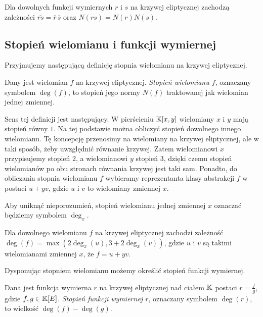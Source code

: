 \begin{fact}
Dla dowolnych funkcji wymiernych $r$ i $s$ na krzywej eliptycznej
zachodzą zależności
$\overline{rs} = \overline{r}\,\overline{s}$
oraz $N(rs) = N(r)N(s)$.
\end{fact}

\subsection*{Stopień wielomianu i funkcji wymiernej}

Przyjmujemy następującą definicję stopnia wielomianu na krzywej eliptycznej.

\begin{definition}
Dany jest wielomian $f$ na krzywej eliptycznej.
\emph{Stopień wielomianu $f$},
oznaczany symbolem $\deg(f)$,
to stopień jego normy $N(f)$ traktowanej jak wielomian jednej zmiennej.
\end{definition}

Sens tej definicji jest następujący.
W pierścieniu $\mathbb{K}[x, y]$ wielomiany $x$ i $y$ mają stopień równy $1$.
Na tej podstawie można obliczyć stopień dowolnego innego wielomianu.
Tę koncepcję przenosimy na wielomiany na krzywej eliptycznej,
ale w taki sposób, żeby uwzględnić równanie krzywej.
Zatem wielomianowi $x$ przypisujemy stopień $2$,
a wielomianowi $y$ stopień $3$,
dzięki czemu stopień wielomianów po obu stronach równania krzywej jest taki sam.
Ponadto, do obliczania stopnia wielomianu $f$
wybieramy reprezentanta klasy abstrakcji $f$ w postaci $u + yv$,
gdzie $u$ i $v$ to wielomiany zmiennej $x$.

\begin{remark}
Aby uniknąć nieporozumień,
stopień wielomianu jednej zmiennej $x$
oznaczać będziemy symbolem $\deg_x$.
\end{remark}

\begin{fact}
Dla dowolnego wielomianu $f$ na krzywej eliptycznej
zachodzi zależność $\deg(f) = \max(2\deg_x(u), 3 + 2\deg_x(v))$,
gdzie $u$ i $v$ są takimi wielomianami zmiennej $x$, że $f = u + yv$.
\end{fact}

Dysponując stopniem wielomianu możemy określić stopień funkcji wymiernej.

\begin{definition}
Dana jest funkcja wymierna $r$ na krzywej eliptycznej nad ciałem $\mathbb{K}$
postaci $r = \frac{f}{g}$, gdzie $f, g \in \mathbb{K}[E]$.
\emph{Stopień funkcji wymiernej $r$},
oznaczany symbolem $\deg(r)$,
to wielkość $\deg(f) - \deg(g)$.
\end{definition}

